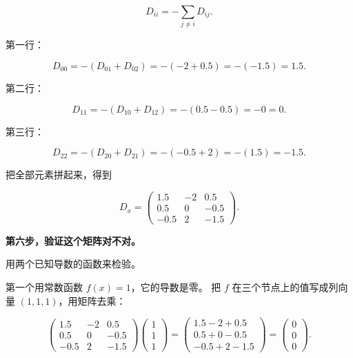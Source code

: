 \begin{equation}
D_{ii}=-\sum_{j\ne i}D_{ij}.
\end{equation}

第一行：

\begin{equation}
D_{00}=-(D_{01}+D_{02})=-(-2+0.5)=-(-1.5)=1.5 .
\end{equation}

第二行：

\begin{equation}
D_{11}=-(D_{10}+D_{12})=-(0.5-0.5)=-0=0 .
\end{equation}

第三行：

\begin{equation}
D_{22}=-(D_{20}+D_{21})=-(-0.5+2)=-(1.5)=-1.5 .
\end{equation}

把全部元素拼起来，得到

\begin{equation}
D_x=
\begin{pmatrix}
1.5 & -2 & 0.5\\
0.5 & 0 & -0.5\\
-0.5 & 2 & -1.5
\end{pmatrix}.
\end{equation}

\textbf{第六步，验证这个矩阵对不对。}

用两个已知导数的函数来检验。

第一个用常数函数 $f(x)=1$，它的导数是零。
把 $f$ 在三个节点上的值写成列向量 $(1,1,1)$，用矩阵去乘：

\begin{equation}
\begin{pmatrix}1.5 & -2 & 0.5\\ 0.5 & 0 & -0.5\\ -0.5 & 2 & -1.5\end{pmatrix}
\begin{pmatrix}1\\1\\1\end{pmatrix}
=
\begin{pmatrix}1.5-2+0.5\\ 0.5+0-0.5\\ -0.5+2-1.5\end{pmatrix}
=
\begin{pmatrix}0\\0\\0\end{pmatrix}.
\end{equation}

